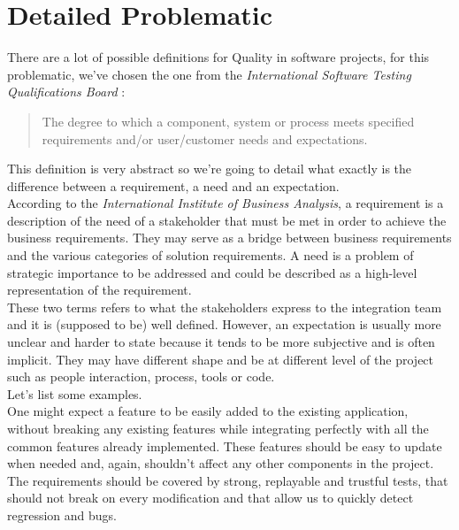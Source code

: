 \section{Detailed Problematic}\label{sec:detailed-problematic}
There are a lot of possible definitions for Quality in software projects, for
this problematic, we've chosen the one from the \textit{International Software
Testing Qualifications Board} :
\begin{quote}
The degree to which a component, system or process meets specified
requirements and/or user/customer needs and expectations.
\end{quote}
This definition is very abstract so we're going to detail what exactly is the
difference between a requirement, a need and an expectation. \\
According to the \textit{International Institute of Business Analysis}, a
requirement is a description of the need of a stakeholder that must be met in
order to achieve the business requirements.
They may serve as a bridge between business requirements and the various
categories of solution requirements.
A need is a problem of strategic importance to be addressed and could be
described as a high-level representation of the requirement. \\
These two terms refers to what the stakeholders express to the integration
team and it is (supposed to be) well defined.
However, an expectation is usually more unclear and harder to state because
it tends to be more subjective and is often implicit.
They may have different shape and be at different level of the project such as
people interaction, process, tools or code. \\
\newline
Let's list some examples. \\
One might expect a feature to be easily added to the existing application,
without breaking any existing features while integrating perfectly with all the
common features already implemented.
These features should be easy to update when needed and, again, shouldn't
affect any other components in the project.
The requirements should be covered by strong, replayable and trustful tests,
that should not break on every modification and that allow us to quickly
detect regression and bugs. \\
